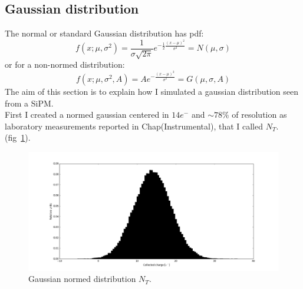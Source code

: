 \documentclass[10pt,a4paper, openany]{book}
\begin{document}
\subsection{Gaussian distribution}
The normal or standard Gaussian distribution has pdf:
\begin{equation}
f(x; \mu , \sigma^2) = \frac{1}{\sigma \sqrt{2\pi}} e^{-\frac{1}{2}\frac{(x- \mu)^2}{\sigma^2}} = N(\mu, \sigma)
\end{equation}
or for a non-normed distribution:
\begin{equation}
f(x; \mu , \sigma^2, A) = A e^{-\frac{(x- \mu)^2}{\sigma^2}} = G(\mu, \sigma, A)
\end{equation}
The aim of this section is to explain how I simulated a gaussian distribution seen from a SiPM.\\
First I created a normed gaussian centered in $14e^-$ and $\sim 78\%$ of resolution as laboratory measurements reported in Chap(Instrumental), that I called $N_T$. (fig~\ref{fig:4}).
\begin{figure}[!h]
\begin{center}
\includegraphics[scale=0.3]{imm/gaussian.png}
\end{center}
\caption{Gaussian normed distribution $N_T$.}
\label{fig:4}
\end{figure}
\end{document}
